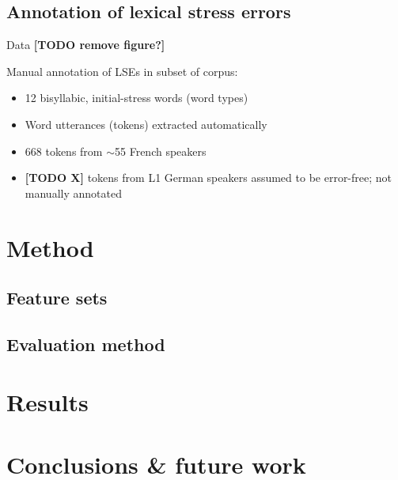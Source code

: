 \documentclass[xcolor={dvipsnames}]{beamer}
\newcommand{\TODO}[1]{{\color{red}\textbf{[TODO #1]}}}
\begin{document}
\subsection{Annotation of lexical stress errors}
\begin{frame}{Data \TODO{remove figure?}}
	
	Manual annotation of LSEs in subset of corpus:\\
	\begin{itemize}
	\item{12 bisyllabic, initial-stress words (word types)
	}
	\item{Word utterances (tokens) extracted automatically}
	\item{%
	668 tokens from $\sim$55 French speakers}
	\item{\TODO{X} tokens from L1 German speakers assumed to be error-free; not manually annotated}
	\end{itemize}
	
	
\end{frame}

\section{Method}
\subsection{Feature sets}
\begin{frame}
\end{frame}
\subsection{Evaluation method}
\begin{frame}
\end{frame}

\section{Results}
\begin{frame}
\end{frame}
\begin{frame}
\end{frame}

\section{Conclusions \& future work}
\begin{frame}
\end{frame}
\end{document}
